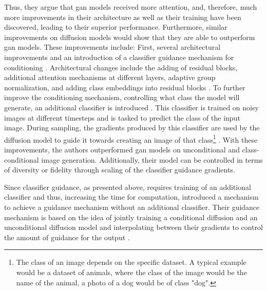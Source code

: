 Thus, they argue that \gls{gan} models received more attention, and, therefore, much more improvements in their architecture as well as their training have been discovered, leading to their superior performance.
Furthermore, similar improvements on diffusion models would show that they are able to outperform \gls{gan} models.
These improvements include:
First, several architectural improvements \cite[section 3]{dhariwal2021DiffusionModelsBeat} and an introduction of a classifier guidance mechanism for conditioning \cite[section 4]{dhariwal2021DiffusionModelsBeat}.
Architectural changes include the adding of residual blocks, additional attention mechanisms at different layers, adaptive group normalization, and adding class embeddings into residual blocks \cite{dhariwal2021DiffusionModelsBeat}.
To further improve the conditioning mechanism, \ie controlling what class the model will generate, an additional classifier is introduced \cite{dhariwal2021DiffusionModelsBeat}. 
This classifier is trained on noisy images at different timesteps and is tasked to predict the class of the input image.
During sampling, the gradients produced by this classifier are used by the diffusion model to guide it towards creating an image of that class\footnote{The class of an image depends on the specific dataset. A typical example would be a dataset of animals, where the class of the image would be the name of the animal, \eg a photo of a dog would be of class "dog".} \cite{dhariwal2021DiffusionModelsBeat}.
With these improvements, the authors outperformed \gls{gan} models on unconditional and class-conditional image generation.
Additionally, their model can be controlled in terms of diversity or fidelity through scaling of the classifier guidance gradients.

Since classifier guidance, as presented above, requires training of an additional classifier and thus, increasing the time for computation, \cite{ho2022ClassifierFreeDiffusionGuidance}
introduced a mechanism to achieve a guidance mechanism without an additional classifier.  
Their guidance mechanism is based on the idea of jointly training a conditional diffusion and an unconditional diffusion model and interpolating between their gradients to control the amount of guidance for the output \cite{ho2022ClassifierFreeDiffusionGuidance}.

